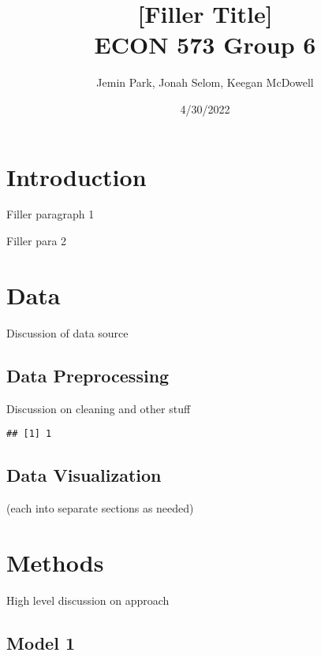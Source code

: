 \documentclass[
  12pt,
]{article}
\title{\vspace{5cm} \LARGE {[}Filler Title{]}\\
\vspace{0.5cm} \Large ECON 573 Group 6}
\author{Jemin Park, Jonah Selom, Keegan McDowell}
\date{4/30/2022}
\begin{document}
\maketitle

\newpage
\maketitle
\newpage
\tableofcontents
\newpage

\hypertarget{introduction}{%
\section{Introduction}\label{introduction}}

Filler paragraph 1

Filler para 2

\hypertarget{data}{%
\section{Data}\label{data}}

Discussion of data source

\hypertarget{data-preprocessing}{%
\subsection{Data Preprocessing}\label{data-preprocessing}}

Discussion on cleaning and other stuff

\begin{verbatim}
## [1] 1
\end{verbatim}

\hypertarget{data-visualization}{%
\subsection{Data Visualization}\label{data-visualization}}

(each into separate sections as needed)

\hypertarget{methods}{%
\section{Methods}\label{methods}}

High level discussion on approach

\hypertarget{model-1}{%
\subsection{Model 1}\label{model-1}}
\end{document}

